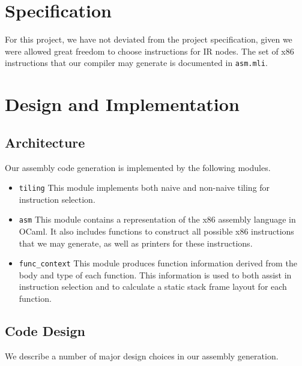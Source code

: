 \documentclass{hw}
\begin{document}
\section{Specification}\label{sec:specification}
For this project, we have not deviated from the project specification, given we were allowed
great freedom to choose instructions for IR nodes. The set of x86 instructions that our
compiler may generate is documented in \texttt{asm.mli}.

\section{Design and Implementation}\label{sec:design}
\subsection{Architecture}
Our assembly code generation is implemented by the following modules.
\begin{itemize}
  \item \texttt{tiling}
    This module implements both naive and non-naive tiling for instruction selection.

  \item \texttt{asm}
    This module contains a representation of the x86 assembly language in OCaml. It also
    includes functions to construct all possible x86 instructions that we may generate,
    as well as printers for these instructions.

  \item \texttt{func\_context}
    This module produces function information derived from the body and type of each function.
    This information is used to both assist in instruction selection and to calculate a 
    static stack frame layout for each function.
\end{itemize}

\subsection{Code Design}
We describe a number of major design choices in our assembly generation.    
\end{document}

